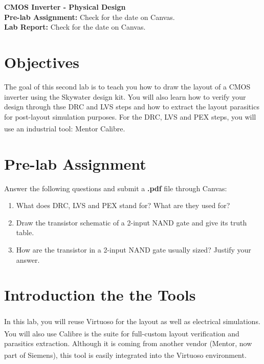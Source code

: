 \newcommand{\labtitle}{ECE/CS 5710/6710 - Lab 2}
\newcommand{\labsubtitle}{CMOS Inverter - Physical Design}
\vlsiheader


\begin{center}
\LARGE\textbf{\labsubtitle} \\
	\large\textbf{Pre-lab Assignment:} Check for the date on Canvas. \\
	\large\textbf{Lab Report:} Check for the date on Canvas.
\end{center}
\section{Objectives}
The goal of this second lab is to teach you how to draw the layout of a CMOS inverter using the Skywater design kit. You will also learn how to verify your design through thse DRC and LVS steps and how to extract the layout parasitics for post-layout simulation purposes. For the DRC, LVS and PEX steps, you will use an industrial tool: Mentor Calibre\textsuperscript{\tiny\textregistered}.



\section{Pre-lab Assignment}
\begin{prelab}
Answer the following questions and submit a \textbf{.pdf} file through Canvas:
\begin{enumerate}
	\item What does DRC, LVS and PEX stand for? What are they used for?
	\item Draw the transistor schematic of a 2-input NAND gate and give its truth table.
	\item How are the transistor in a 2-input NAND gate usually sized? Justify your answer.
\end{enumerate}
	\vspace{-5mm}
\end{prelab}

\section{Introduction the the Tools}
In this lab, you will reuse Virtuoso\textsuperscript{\tiny\textregistered} for the layout as well as electrical simulations. You will also use Calibre\textsuperscript{\tiny\textregistered} is the suite for full-custom layout verification and parasitics extraction. Although it is coming from another vendor (Mentor, now part of Siemens), this tool is easily integrated into the Virtuoso\textsuperscript{\tiny\textregistered} environment.


